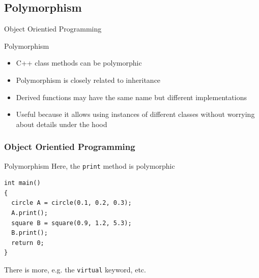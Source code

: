 \documentclass[compress]{beamer}
\begin{document}
\subsection{Polymorphism}

\begin{frame}{Object Orientied Programming}
	\begin{block}{Polymorphism}
		\begin{itemize}
			\item C++ class methods can be polymorphic
			\item Polymorphism is closely related to inheritance
			\item Derived functions may have the same name but different implementations
			\item Useful because it allows using instances of different  classes without worrying about details under the hood
		\end{itemize}
	\end{block}
\end{frame}


\begin{frame}[fragile]
	\frametitle{Object Orientied Programming}
	\begin{exampleblock}{Polymorphism}
Here, the \texttt{print} method is polymorphic
	\end{exampleblock}
\begin{lstlisting}
int main()
{
  circle A = circle(0.1, 0.2, 0.3);
  A.print();
  square B = square(0.9, 1.2, 5.3);
  B.print();
  return 0;
}
\end{lstlisting}
There is more, e.g. the \texttt{virtual} keyword, etc.
\end{frame}
\end{document}
